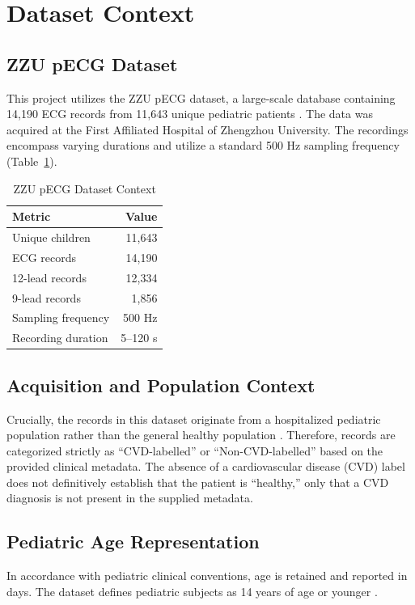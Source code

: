 \documentclass[11pt, a4paper]{article}
\begin{document}
\section{Dataset Context}

\subsection{ZZU pECG Dataset}
This project utilizes the ZZU pECG dataset, a large-scale database containing 14,190 ECG records from 11,643 unique pediatric patients \cite{Tan2025}. The data was acquired at the First Affiliated Hospital of Zhengzhou University. The recordings encompass varying durations and utilize a standard 500 Hz sampling frequency (Table~\ref{tab:dataset_context}).

\begin{table}[htbp]
    \centering
    \caption{ZZU pECG Dataset Context \cite{Tan2025}}
    \begin{tabular}{lr}
        \toprule
        \textbf{Metric} & \textbf{Value} \\
        \midrule
        Unique children & 11,643 \\
        ECG records & 14,190 \\
        12-lead records & 12,334 \\
        9-lead records & 1,856 \\
        Sampling frequency & 500 Hz \\
        Recording duration & 5--120 s \\
        \bottomrule
    \end{tabular}
    \label{tab:dataset_context}
\end{table}

\subsection{Acquisition and Population Context}
Crucially, the records in this dataset originate from a hospitalized pediatric population rather than the general healthy population \cite{Tan2025}. Therefore, records are categorized strictly as ``CVD-labelled'' or ``Non-CVD-labelled'' based on the provided clinical metadata. The absence of a cardiovascular disease (CVD) label does not definitively establish that the patient is ``healthy,'' only that a CVD diagnosis is not present in the supplied metadata. 

\subsection{Pediatric Age Representation}
In accordance with pediatric clinical conventions, age is retained and reported in days. The dataset defines pediatric subjects as 14 years of age or younger \cite{Tan2025}.
\end{document}
